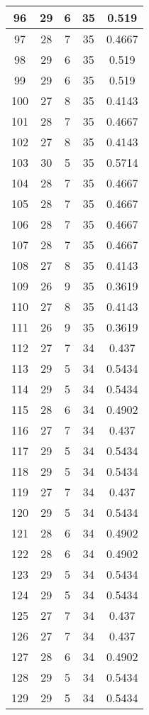 \documentclass[letterpaper, 12pt]{article}
\begin{document}
\begin{longtable}{|c|c|c|c|c|}
\hline
96 & 29 & 6 & 35 & 0.519 \\
\hline
97 & 28 & 7 & 35 & 0.4667 \\
\hline
98 & 29 & 6 & 35 & 0.519 \\
\hline
99 & 29 & 6 & 35 & 0.519 \\
\hline
100 & 27 & 8 & 35 & 0.4143 \\
\hline
101 & 28 & 7 & 35 & 0.4667 \\
\hline
102 & 27 & 8 & 35 & 0.4143 \\
\hline
103 & 30 & 5 & 35 & 0.5714 \\
\hline
104 & 28 & 7 & 35 & 0.4667 \\
\hline
105 & 28 & 7 & 35 & 0.4667 \\
\hline
106 & 28 & 7 & 35 & 0.4667 \\
\hline
107 & 28 & 7 & 35 & 0.4667 \\
\hline
108 & 27 & 8 & 35 & 0.4143 \\
\hline
109 & 26 & 9 & 35 & 0.3619 \\
\hline
110 & 27 & 8 & 35 & 0.4143 \\
\hline
111 & 26 & 9 & 35 & 0.3619 \\
\hline
112 & 27 & 7 & 34 & 0.437 \\
\hline
113 & 29 & 5 & 34 & 0.5434 \\
\hline
114 & 29 & 5 & 34 & 0.5434 \\
\hline
115 & 28 & 6 & 34 & 0.4902 \\
\hline
116 & 27 & 7 & 34 & 0.437 \\
\hline
117 & 29 & 5 & 34 & 0.5434 \\
\hline
118 & 29 & 5 & 34 & 0.5434 \\
\hline
119 & 27 & 7 & 34 & 0.437 \\
\hline
120 & 29 & 5 & 34 & 0.5434 \\
\hline
121 & 28 & 6 & 34 & 0.4902 \\
\hline
122 & 28 & 6 & 34 & 0.4902 \\
\hline
123 & 29 & 5 & 34 & 0.5434 \\
\hline
124 & 29 & 5 & 34 & 0.5434 \\
\hline
125 & 27 & 7 & 34 & 0.437 \\
\hline
126 & 27 & 7 & 34 & 0.437 \\
\hline
127 & 28 & 6 & 34 & 0.4902 \\
\hline
128 & 29 & 5 & 34 & 0.5434 \\
\hline
129 & 29 & 5 & 34 & 0.5434 \\

\end{longtable}
\end{document}
